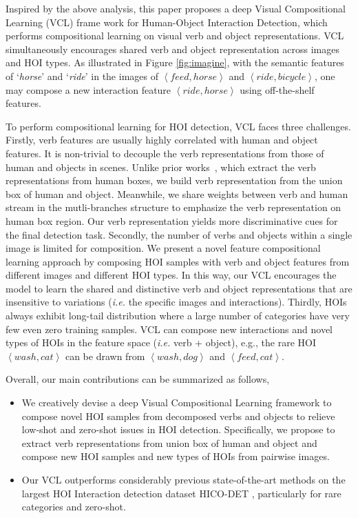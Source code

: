 \documentclass[runningheads]{llncs}
\newcommand{\ie}{\textit{i.e. }}
\begin{document}
Inspired by the above analysis, this paper proposes a deep Visual Compositional Learning (VCL) frame work for Human-Object Interaction Detection, which performs compositional learning on visual verb and object representations. VCL simultaneously encourages shared verb and object representation across images and HOI types.
As illustrated in Figure \ref{fig:imagine}, with the semantic features of `\textit{horse}' and `\textit{ride}' in the images of $\left\langle feed, horse\right \rangle$ and $\left \langle ride, bicycle\right\rangle$, one may compose a new interaction feature $\left \langle ride, horse\right \rangle$ using off-the-shelf features.


To perform compositional learning for HOI detection, VCL faces three challenges. Firstly, verb features are usually highly correlated with human and object features. It is non-trivial to decouple the verb representations from those of human and objects in scenes. Unlike prior works~\cite{gao2018ican, gupta2018no}, which extract the verb representations from human boxes, we build verb representation from the union box of human and object. Meanwhile, we share weights between verb and human stream in the mutli-branches structure to emphasize the verb representation on human box region. Our verb representation yields more discriminative cues for the final detection task. Secondly, the number of verbs and objects within a single image is limited for composition. We present a novel feature compositional learning approach by composing HOI samples with verb and object features from different images and different HOI types.
In this way, our VCL encourages the model to learn the shared and distinctive verb and object representations that are insensitive to variations (\ie the specific images and interactions). Thirdly, HOIs always exhibit long-tail distribution where a large number of categories have very few even zero training samples. VCL can compose new interactions and novel types of HOIs in the feature space (\ie verb + object), e.g., the rare HOI $\left \langle wash, cat\right \rangle$ can be drawn from $\left \langle wash, dog\right \rangle$ and $\left \langle feed, cat\right \rangle$.

Overall, our main contributions can be summarized as follows,



\begin{itemize}
\item We creatively devise a deep Visual Compositional Learning framework to compose novel HOI samples from decomposed verbs and objects to relieve low-shot and zero-shot issues in HOI detection. Specifically, we propose to extract verb representations from union box of human and object and compose new HOI samples and new types of HOIs from pairwise images.
\item Our VCL outperforms considerably previous state-of-the-art methods on the largest HOI Interaction detection dataset HICO-DET \cite{chao2018learning}, particularly for rare categories and zero-shot.
\end{itemize}
\end{document}
